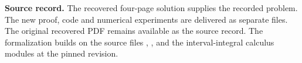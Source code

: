 \documentclass[11pt,letterpaper]{article}
\begin{document}
\textbf{Source record.} The recovered four-page solution supplies the recorded problem. The new proof, code and numerical experiments are delivered as separate files. The original recovered PDF remains available as the source record. The formalization builds on the source files , , and the interval-integral calculus modules at the pinned revision.
\end{document}
